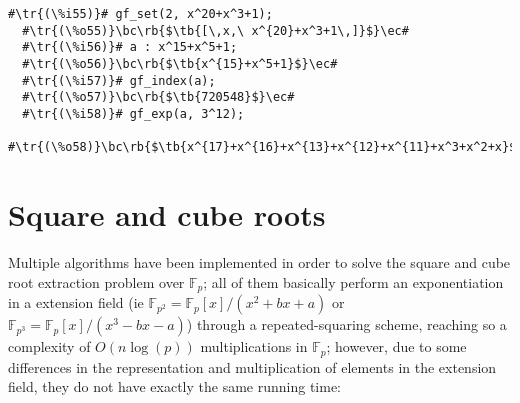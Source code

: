 \documentclass[a4paper,11pt,leqno,fleqn]{artikel3}
\newcommand{\bc}{\begin{center}}
\newcommand{\ec}{\end{center}}
\newcommand{\tr}[1]{\textcolor{red}{#1}}
\newcommand{\tb}[1]{\textcolor{blue}{#1}}
\newcommand{\rb}[1]{\raisebox{2mm}[0mm][1mm]{#1}}
\begin{document}
\vspace*{2mm}
\begin{lstlisting}[escapechar=\#]
  #\tr{(\%i55)}# gf_set(2, x^20+x^3+1);
  #\tr{(\%o55)}\bc\rb{$\tb{[\,x,\ x^{20}+x^3+1\,]}$}\ec#
  #\tr{(\%i56)}# a : x^15+x^5+1;
  #\tr{(\%o56)}\bc\rb{$\tb{x^{15}+x^5+1}$}\ec#
  #\tr{(\%i57)}# gf_index(a);
  #\tr{(\%o57)}\bc\rb{$\tb{720548}$}\ec#
  #\tr{(\%i58)}# gf_exp(a, 3^12);
  #\tr{(\%o58)}\bc\rb{$\tb{x^{17}+x^{16}+x^{13}+x^{12}+x^{11}+x^3+x^2+x}$}\ec#
\end{lstlisting}



\section*{Square and cube roots}
Multiple algorithms have been implemented in order to solve the square and cube root extraction problem over $\mathbb{F}_p$; all of them basically perform an exponentiation in a extension field (ie $\mathbb{F}_{p^2}=\mathbb{F}_{p}[x]/(x^2+bx+a)$ or $\mathbb{F}_{p^3}=\mathbb{F}_{p}[x]/(x^3-bx-a)$) through a repeated-squaring scheme, reaching so a complexity of $O(n \log(p))$ multiplications in $\mathbb{F}_p$; however, due to some differences in the representation and multiplication of elements in the extension field, they do not have exactly the same running time:
\end{document}
